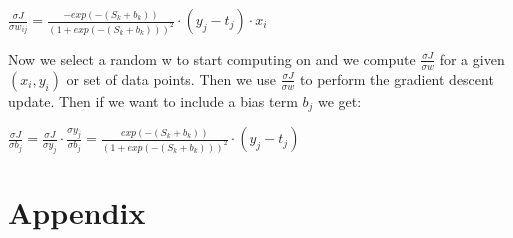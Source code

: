 \documentclass[12pt]{article}
\begin{document}
$\frac{\sigma J}{\sigma w_{ij}} = 
\frac{-exp(-(S_k + b_k))}{(1 + exp(-(S_k + b_k)))^2}
\cdot (y_j - t_j) \cdot x_i$

Now we select a random w to start computing on and we compute $\frac{\sigma J}{\sigma w}$ for a given $(x_i, y_i)$ or set of data points. Then we use $\frac{\sigma J}{\sigma w}$ to perform the gradient descent update. Then if we want to include a bias term $b_j$ we get:

$\frac{\sigma J}{\sigma b_j} =
\frac{\sigma J}{\sigma y_j} \cdot \frac{\sigma y_j}{\sigma b_j}
= \frac{exp(-(S_k + b_k))}{(1 + exp(-(S_k + b_k)))^2}
\cdot (y_j - t_j)
$

 

\newpage
\section*{Appendix}
\end{document}
